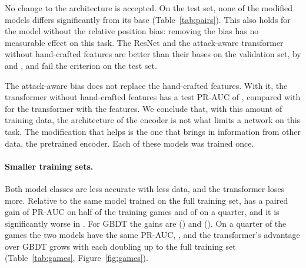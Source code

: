 \documentclass[11pt]{article}
\begin{document}
No change to the architecture is accepted. On the test set, none of the
modified models differs significantly from its base
(Table~\ref{tab:pairs}).\ifchangegeometry{} This also holds for the model
without the relative position bias: removing the bias has no measurable
effect on this task.\fi\ifchangeconv\ifchangeattacks{} The ResNet and the
attack-aware transformer without hand-crafted features are better than their
bases on the validation set, by
 and
, and fail
the criterion on the test set.\fi\fi

\ifchangeattacks
The attack-aware bias does not replace the hand-crafted features. With it,
the transformer without hand-crafted features has a test PR-AUC of
, compared with
 for the transformer with the features.
\fi
We conclude that, with this amount of training data, the architecture of the
encoder is not what limits a network on this task.\ifchangestart{} The
modification that helps is the one that brings in information from other
data, the pretrained encoder.\fi{} Each of these models was trained once.
\fi



\ifgames
\paragraph{Smaller training sets.}
Both model classes are less accurate with less data, and the transformer
loses more. Relative to the same model trained on the full training set,
 has a paired gain of
 PR-AUC on
half of the training games and of
 on a
quarter, and it is significantly worse in
. For GBDT the gains are
() and
(). On a quarter of the games the
two models have the same PR-AUC, , and the
transformer's advantage over GBDT grows with each doubling up to the full
training set (Table~\ref{tab:games}, Figure~\ref{fig:games}).
\fi

\ifmore
\end{document}

